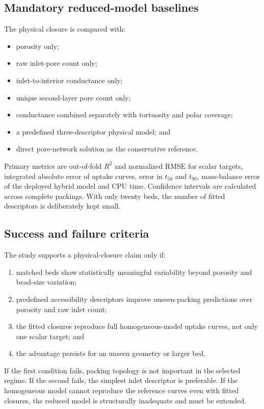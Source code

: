 \documentclass[12pt,a4paper]{article}
\begin{document}
\subsection{Mandatory reduced-model baselines}

The physical closure is compared with:
\begin{itemize}
 \item porosity only;
 \item raw inlet-pore count only;
 \item inlet-to-interior conductance only;
 \item unique second-layer pore count only;
 \item conductance combined separately with tortuosity and polar coverage;
 \item a predefined three-descriptor physical model; and
 \item direct pore-network solution as the conservative reference.
\end{itemize}

Primary metrics are out-of-fold $R^2$ and normalized RMSE for scalar targets,
integrated absolute error of uptake curves, error in $t_{50}$ and $t_{90}$,
mass-balance error of the deployed hybrid model and CPU time. Confidence
intervals are calculated across complete packings. With only twenty beds, the
number of fitted descriptors is deliberately kept small.

\subsection{Success and failure criteria}

The study supports a physical-closure claim only if:
\begin{enumerate}
 \item matched beds show statistically meaningful variability beyond porosity
 and bead-size variation;
 \item predefined accessibility descriptors improve unseen-packing predictions
 over porosity and raw inlet count;
 \item the fitted closures reproduce full homogeneous-model uptake curves,
 not only one scalar target; and
 \item the advantage persists for an unseen geometry or larger bed.
\end{enumerate}

If the first condition fails, packing topology is not important in the selected
regime. If the second fails, the simplest inlet descriptor is preferable. If
the homogeneous model cannot reproduce the reference curves even with fitted
closures, the reduced model is structurally inadequate and must be extended.
\end{document}
